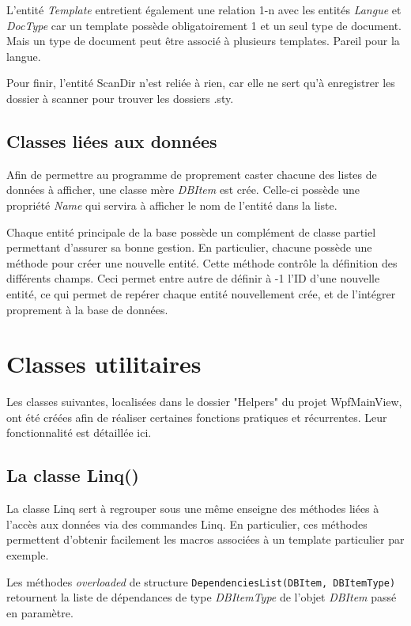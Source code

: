 \documentclass[a4paper, oneside]{article}
\begin{document}
L'entité \emph{Template} entretient également une relation 1-n avec les entités \emph{Langue} et
\emph{DocType} car un template possède obligatoirement 1 et un seul type de
document. Mais un type de document peut être associé à plusieurs
templates. Pareil pour la langue.

Pour finir, l'entité ScanDir n'est reliée à rien, car elle ne sert
qu'à enregistrer les dossier à scanner pour trouver les dossiers .sty.
\subsection{Classes liées aux données}
\label{sec:orgc400bda}
Afin de permettre au programme de proprement caster chacune des listes
de données à afficher, une classe mère \emph{DBItem} est crée. Celle-ci
possède une propriété \emph{Name} qui servira à afficher le nom de l'entité
dans la liste.

Chaque entité principale de la base possède un complément de classe
partiel permettant d'assurer sa bonne gestion. En particulier, chacune
possède une méthode pour créer une nouvelle entité. Cette méthode
contrôle la définition des différents champs. Ceci permet entre autre
de définir à -1 l'ID d'une nouvelle entité, ce qui permet de repérer
chaque entité nouvellement crée, et de l'intégrer proprement à la base
de données.

\section{Classes utilitaires}
\label{sec:org24ac5d0}
Les classes suivantes, localisées dans le dossier "Helpers" du projet
WpfMainView, ont été créées afin de réaliser certaines fonctions
pratiques et récurrentes. Leur fonctionnalité est détaillée ici.

\subsection{La classe Linq()}
\label{sec:org9cc2b21}
La classe Linq sert à regrouper sous une même enseigne des méthodes
liées à l'accès aux données via des commandes Linq. En particulier,
ces méthodes permettent d'obtenir facilement les macros associées à un
template particulier par exemple.

Les méthodes \emph{overloaded} de structure \texttt{DependenciesList(DBItem,
DBItemType)} retournent la liste de dépendances de type \emph{DBItemType}
de l'objet \emph{DBItem} passé en paramètre.
\end{document}
